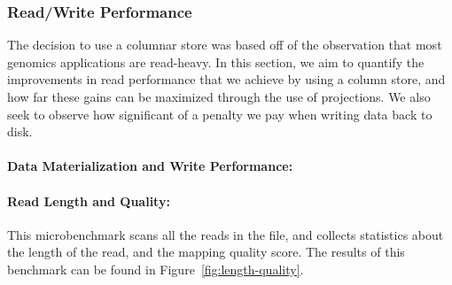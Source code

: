 \documentclass[10pt,twocolumn]{article}
\theoremstyle{plain}
\begin{document}
\subsubsection{Read/Write Performance}
\label{sec:read-write-performance}

The decision to use a columnar store was based off of the observation that most genomics applications are read-heavy. In this section,
we aim to quantify the improvements in read performance that we achieve by using a column store, and how far these gains can be
maximized through the use of projections. We also seek to observe how significant of a penalty we pay when writing data back to disk.

\paragraph{Data Materialization and Write Performance:}
\label{sec:data-materialization}

\paragraph{Read Length and Quality:}
\label{sec:read-length-and-quality}

This microbenchmark scans all the reads in the file, and collects statistics about the length of the read, and the mapping quality score.
The results of this benchmark can be found in Figure~\ref{fig:length-quality}.
\end{document}
